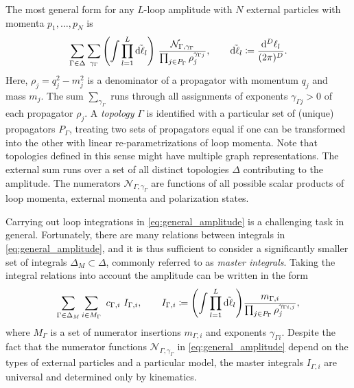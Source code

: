 The most general form for any $L$-loop amplitude with $N$ external particles with momenta $p_1,\ldots,p_N$ is
\begin{equation}
  \sum_{\Gamma \in \Delta} \sum_{\gamma_\Gamma} \qty(\int \prod_{l=1}^{L} \tilde{\dd{\ell_l}}) ~ 
  \frac{\mathcal{N}_{\Gamma,\gamma_\Gamma}%
    }{\prod_{j\in P_\Gamma} \rho_j^{\gamma_{\Gamma j}}},
    \qquad \tilde{\dd{\ell_l}} \coloneqq \frac{\dd[D]{\ell_l}}{(2\pi)^{D}}.
  \label{eq:general_amplitude}
\end{equation}
Here, $\rho_j = q_j^2 - m_j^2$ is a denominator of a propagator with momentum $q_j$ and mass $m_j$. The sum $\sum_{\gamma_\Gamma}$ runs through all assignments
of exponents $\gamma_{\Gamma j} > 0$ of each propagator $\rho_j$. 
A \emph{topology} $\Gamma$ is identified with a particular set of (unique) propagators $P_\Gamma$,
treating two sets of propagators equal if one can be transformed into the other with linear re-parametrizations of loop momenta.
Note that topologies defined in this sense might have multiple graph representations.
The external sum runs over a set of all distinct topologies $\Delta$ contributing to the amplitude.
The numerators $\mathcal{N}_{\Gamma,\gamma_\Gamma}$
are functions of all possible scalar products of loop momenta, external momenta and polarization states.

Carrying out loop integrations in \cref{eq:general_amplitude} is a challenging task in general.
Fortunately, there are many relations between integrals in \cref{eq:general_amplitude},
and it is thus sufficient to consider a significantly smaller set of integrals $\Delta_M \subset \Delta$, commonly referred to
as \emph{master integrals}.
Taking the integral relations into account the amplitude can be written in the form
\begin{equation}
  \sum_{\Gamma \in \Delta_M} \sum_{i\in M_\Gamma} ~ c_{\Gamma,i} ~ I_{\Gamma,i}, 
    \qquad I_{\Gamma,i} \coloneqq 
      \qty(\int \prod_{l=1}^{L} \tilde{\dd{\ell_l}}) \frac{m_{\Gamma,i}}{\prod_{j\in P_\Gamma} \rho_j^{\gamma_{\Gamma i,j}}},
  \label{eq:amplitude_integrated}
\end{equation}
where $M_{\Gamma}$ is a set of numerator insertions $m_{\Gamma,i}$ and exponents $\gamma_{\Gamma i}$.
Despite the fact that the numerator functions $\mathcal{N}_{\Gamma,\gamma_\Gamma}$ in \cref{eq:general_amplitude} depend on the types of external particles and a particular model,
the master integrals $I_{\Gamma,i}$ are universal and determined only by kinematics.

